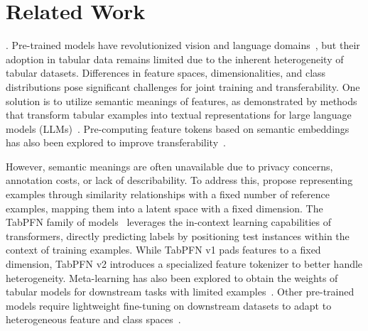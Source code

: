 \section{Related Work}\label{sec:related_work}
.
Pre-trained models have revolutionized vision and language domains~\citep{Kirillov2023Segment, zhou2024comprehensive}, but their adoption in tabular data remains limited due to the inherent heterogeneity of tabular datasets. Differences in feature spaces, dimensionalities, and class distributions pose significant challenges for joint training and transferability. %
One solution is to utilize semantic meanings of features, as demonstrated by methods that transform tabular examples into textual representations for large language models (LLMs)~\citep{Hegselmann2022TabLLM, Zhang2023Generative, Wang2023AnyPredict, WenZZXB24From}. Pre-computing feature tokens based on semantic embeddings has also been explored to improve transferability~\citep{Yan2024Making, Kim2024CARTE}.

However, semantic meanings are often unavailable due to privacy concerns, annotation costs, or lack of describability. To address this, \citet{Ye2023TabPTM} propose representing examples through similarity relationships with a fixed number of reference examples, mapping them into a latent space with a fixed dimension. The TabPFN family of models~\citep{Hollmann2022TabPFN, hollmann2025TabPFNv2} leverages the in-context learning capabilities of transformers, directly predicting labels by positioning test instances within the context of training examples. While TabPFN v1 pads features to a fixed dimension, TabPFN v2 introduces a specialized feature tokenizer to better handle heterogeneity. Meta-learning has also been explored to obtain the weights of tabular models for downstream tasks with limited examples~\citep{Iwata2020Meta, BonetMGI2024HyperFast}. Other pre-trained models require lightweight fine-tuning on downstream datasets to adapt to heterogeneous feature and class spaces~\citep{Liu2022Distribution, Zhang2023Meta, Shen2023Cross, zhu2023xtab}.


